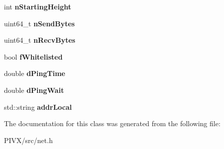 \begin{DoxyCompactItemize}
int {\bfseries n\+Starting\+Height}
\item 
\mbox{\label{class_c_node_stats_a3c70b0862e9ddd682380114016196137}} 
uint64\+\_\+t {\bfseries n\+Send\+Bytes}
\item 
\mbox{\label{class_c_node_stats_a1aaec0f47a95487cbd709caf15889663}} 
uint64\+\_\+t {\bfseries n\+Recv\+Bytes}
\item 
\mbox{\label{class_c_node_stats_a39afa3b5edc1747678667aae5acab3ec}} 
bool {\bfseries f\+Whitelisted}
\item 
\mbox{\label{class_c_node_stats_a535c198cbe3af112d4538f535e6618cd}} 
double {\bfseries d\+Ping\+Time}
\item 
\mbox{\label{class_c_node_stats_a03a38f87940d04b321b9fb3102d0368d}} 
double {\bfseries d\+Ping\+Wait}
\item 
\mbox{\label{class_c_node_stats_a027a5445a0c40e6489875e653be9c758}} 
std\+::string {\bfseries addr\+Local}
\end{DoxyCompactItemize}


The documentation for this class was generated from the following file\+:\begin{DoxyCompactItemize}
\item 
P\+I\+V\+X/src/net.\+h\end{DoxyCompactItemize}
